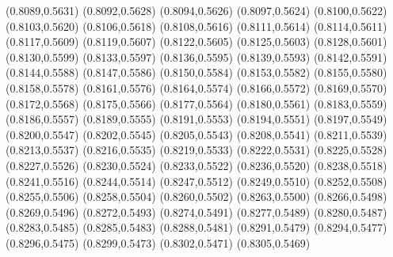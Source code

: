 \PST@Filltriangle(0.8089,0.5631)
\PST@Filltriangle(0.8092,0.5628)
\PST@Filltriangle(0.8094,0.5626)
\PST@Filltriangle(0.8097,0.5624)
\PST@Filltriangle(0.8100,0.5622)
\PST@Filltriangle(0.8103,0.5620)
\PST@Filltriangle(0.8106,0.5618)
\PST@Filltriangle(0.8108,0.5616)
\PST@Filltriangle(0.8111,0.5614)
\PST@Filltriangle(0.8114,0.5611)
\PST@Filltriangle(0.8117,0.5609)
\PST@Filltriangle(0.8119,0.5607)
\PST@Filltriangle(0.8122,0.5605)
\PST@Filltriangle(0.8125,0.5603)
\PST@Filltriangle(0.8128,0.5601)
\PST@Filltriangle(0.8130,0.5599)
\PST@Filltriangle(0.8133,0.5597)
\PST@Filltriangle(0.8136,0.5595)
\PST@Filltriangle(0.8139,0.5593)
\PST@Filltriangle(0.8142,0.5591)
\PST@Filltriangle(0.8144,0.5588)
\PST@Filltriangle(0.8147,0.5586)
\PST@Filltriangle(0.8150,0.5584)
\PST@Filltriangle(0.8153,0.5582)
\PST@Filltriangle(0.8155,0.5580)
\PST@Filltriangle(0.8158,0.5578)
\PST@Filltriangle(0.8161,0.5576)
\PST@Filltriangle(0.8164,0.5574)
\PST@Filltriangle(0.8166,0.5572)
\PST@Filltriangle(0.8169,0.5570)
\PST@Filltriangle(0.8172,0.5568)
\PST@Filltriangle(0.8175,0.5566)
\PST@Filltriangle(0.8177,0.5564)
\PST@Filltriangle(0.8180,0.5561)
\PST@Filltriangle(0.8183,0.5559)
\PST@Filltriangle(0.8186,0.5557)
\PST@Filltriangle(0.8189,0.5555)
\PST@Filltriangle(0.8191,0.5553)
\PST@Filltriangle(0.8194,0.5551)
\PST@Filltriangle(0.8197,0.5549)
\PST@Filltriangle(0.8200,0.5547)
\PST@Filltriangle(0.8202,0.5545)
\PST@Filltriangle(0.8205,0.5543)
\PST@Filltriangle(0.8208,0.5541)
\PST@Filltriangle(0.8211,0.5539)
\PST@Filltriangle(0.8213,0.5537)
\PST@Filltriangle(0.8216,0.5535)
\PST@Filltriangle(0.8219,0.5533)
\PST@Filltriangle(0.8222,0.5531)
\PST@Filltriangle(0.8225,0.5528)
\PST@Filltriangle(0.8227,0.5526)
\PST@Filltriangle(0.8230,0.5524)
\PST@Filltriangle(0.8233,0.5522)
\PST@Filltriangle(0.8236,0.5520)
\PST@Filltriangle(0.8238,0.5518)
\PST@Filltriangle(0.8241,0.5516)
\PST@Filltriangle(0.8244,0.5514)
\PST@Filltriangle(0.8247,0.5512)
\PST@Filltriangle(0.8249,0.5510)
\PST@Filltriangle(0.8252,0.5508)
\PST@Filltriangle(0.8255,0.5506)
\PST@Filltriangle(0.8258,0.5504)
\PST@Filltriangle(0.8260,0.5502)
\PST@Filltriangle(0.8263,0.5500)
\PST@Filltriangle(0.8266,0.5498)
\PST@Filltriangle(0.8269,0.5496)
\PST@Filltriangle(0.8272,0.5493)
\PST@Filltriangle(0.8274,0.5491)
\PST@Filltriangle(0.8277,0.5489)
\PST@Filltriangle(0.8280,0.5487)
\PST@Filltriangle(0.8283,0.5485)
\PST@Filltriangle(0.8285,0.5483)
\PST@Filltriangle(0.8288,0.5481)
\PST@Filltriangle(0.8291,0.5479)
\PST@Filltriangle(0.8294,0.5477)
\PST@Filltriangle(0.8296,0.5475)
\PST@Filltriangle(0.8299,0.5473)
\PST@Filltriangle(0.8302,0.5471)
\PST@Filltriangle(0.8305,0.5469)
